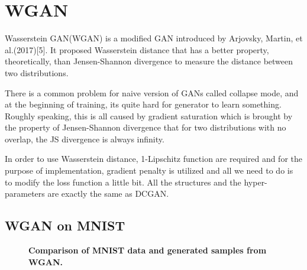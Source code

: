 \documentclass{article}
\newcommand{\mycaption}[2]{\caption[#1]{\textbf{#1.} #2}}
\begin{document}
\section{WGAN}

Wasserstein GAN(WGAN) is a modified GAN introduced by Arjovsky, Martin, et al.(2017)[5]. It proposed Wasserstein distance that has a better property, theoretically, than Jensen-Shannon divergence to measure the distance between two distributions. 

There is a common problem for naive version of GANs called collapse mode, and at the beginning of training, its quite hard for generator to learn something. Roughly speaking, this is all caused by gradient saturation which is brought by the property of Jensen-Shannon divergence that for two distributions with no overlap, the JS divergence is always infinity. 

In order to use Wasserstein distance, 1-Lipschitz function are required and for the purpose of implementation, gradient penalty is utilized and all we need to do is to modify the loss function a little bit. All the structures and the hyper-parameters are exactly the same as DCGAN.  

\subsection{WGAN on MNIST}

\begin{figure}[!htb]
  \centering
  \mycaption{Comparison of MNIST data and generated samples from WGAN}{}
  \label{fig_MNIST}
\end{figure}
\end{document}
